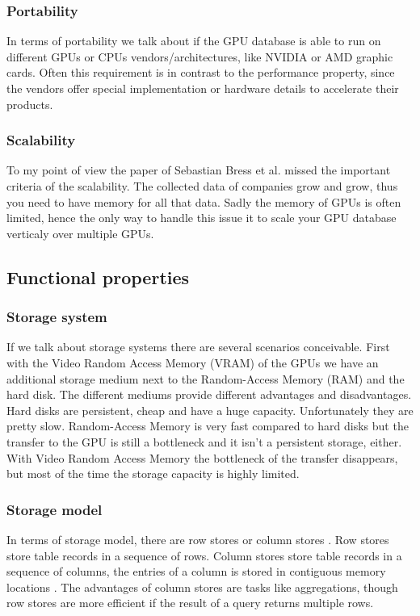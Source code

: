 \subsubsection{Portability}
In terms of portability we talk about if the GPU database is able to run on different GPUs or CPUs vendors/architectures, like NVIDIA or AMD graphic cards.
Often this requirement is in contrast to the performance property, since the vendors offer special implementation or hardware details to accelerate their products.

\subsubsection{Scalability}
To my point of view the paper \cite{bress2014gpu} of Sebastian Bress et al. missed the important criteria of the scalability.
The collected data of companies grow and grow, thus you need to have memory for all that data. Sadly the memory of GPUs is often limited,
hence the only way to handle this issue it to scale your GPU database verticaly over multiple GPUs.

\subsection{Functional properties}

\subsubsection{Storage system}
If we talk about storage systems there are several scenarios conceivable.
First with the Video Random Access Memory (VRAM) of the GPUs we have an additional storage medium next to the Random-Access Memory (RAM) and the hard disk.
The different mediums provide different advantages and disadvantages.
Hard disks are persistent, cheap and have a huge capacity.
Unfortunately they are pretty slow.
Random-Access Memory is very fast compared to hard disks but the transfer to the GPU is still a bottleneck and it isn't a persistent storage, either.
With Video Random Access Memory the bottleneck of the transfer disappears, but most of the time the storage capacity is highly limited.

\subsubsection{Storage model}
In terms of storage model, there are row stores or column stores \cite{abadi2008column}.
Row stores store table records in a sequence of rows.
Column stores store table records in a sequence of columns, the entries of a column is stored in contiguous memory locations \cite{bress2014design}.
The advantages of column stores are tasks like aggregations, though row stores are more efficient if the result of a query returns multiple rows.


